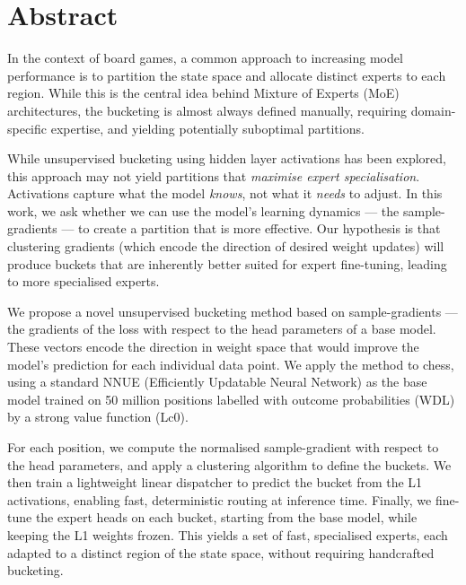 \chapter{Abstract}\label{ch:abstract}

In the context of board games, a common approach to increasing model performance is to partition the state space and allocate distinct experts to each region. While this is the central idea behind Mixture of Experts (MoE) architectures, the bucketing is almost always defined manually, requiring domain-specific expertise, and yielding potentially suboptimal partitions.

While unsupervised bucketing using hidden layer activations has been explored, this approach may not yield partitions that \emph{maximise expert specialisation}. Activations capture what the model \emph{knows}, not what it \emph{needs} to adjust. In this work, we ask whether we can use the model's learning dynamics --- the sample-gradients --- to create a partition that is more effective. Our hypothesis is that clustering gradients (which encode the direction of desired weight updates) will produce buckets that are inherently better suited for expert fine-tuning, leading to more specialised experts.

We propose a novel unsupervised bucketing method based on sample-gradients --- the gradients of the loss with respect to the head parameters of a base model. These vectors encode the direction in weight space that would improve the model's prediction for each individual data point. We apply the method to chess, using a standard NNUE (Efficiently Updatable Neural Network) as the base model trained on 50 million positions labelled with outcome probabilities (WDL) by a strong value function (Lc0).

For each position, we compute the normalised sample-gradient with respect to the head parameters, and apply a clustering algorithm to define the buckets. We then train a lightweight linear dispatcher to predict the bucket from the L1 activations, enabling fast, deterministic routing at inference time. Finally, we fine-tune the expert heads on each bucket, starting from the base model, while keeping the L1 weights frozen. This yields a set of fast, specialised experts, each adapted to a distinct region of the state space, without requiring handcrafted bucketing.

